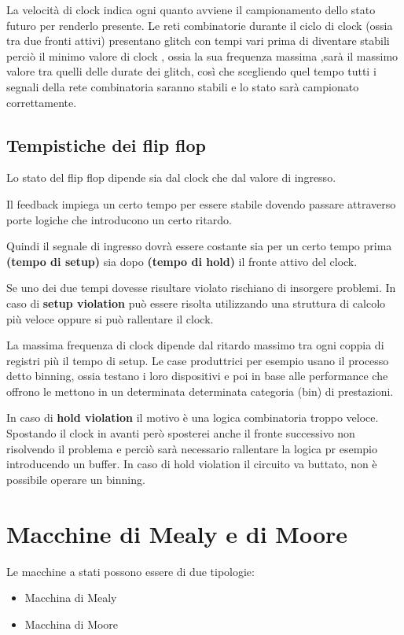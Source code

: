\documentclass[a4paper]{book}
\begin{document}
La velocità di clock indica ogni quanto avviene il campionamento dello stato futuro per renderlo presente.
Le reti combinatorie durante il ciclo di clock (ossia tra due fronti attivi) presentano glitch con tempi vari prima di diventare stabili perciò il minimo valore di clock , ossia la sua frequenza massima ,sarà il massimo valore tra quelli delle durate dei glitch, così che scegliendo quel tempo tutti i segnali della rete combinatoria saranno stabili e lo stato sarà campionato correttamente.

\subsection*{Tempistiche dei flip flop}

Lo stato del flip flop dipende sia dal clock che dal valore di ingresso.

Il feedback impiega un certo tempo per essere stabile dovendo passare attraverso porte logiche che introducono un certo ritardo.

Quindi il segnale di ingresso dovrà essere costante sia per un certo tempo prima \textbf{(tempo di setup)} sia dopo \textbf{(tempo di hold)} il fronte attivo del clock.

Se uno dei due tempi dovesse risultare violato rischiano di insorgere problemi.
In caso di \textbf{setup violation} può essere risolta utilizzando una struttura di calcolo più veloce oppure si può rallentare il clock.

La massima frequenza di clock dipende dal ritardo massimo tra ogni coppia di registri più il tempo di setup.\vspace{\baselineskip}
Le case produttrici per esempio usano il processo detto binning, ossia testano i loro dispositivi e poi in base alle performance che offrono le mettono in un determinata determinata categoria (bin) di prestazioni.

In caso di \textbf{hold violation} il motivo è una logica combinatoria troppo veloce.
Spostando il clock in avanti però sposterei anche il fronte successivo non risolvendo il problema e perciò sarà necessario rallentare la logica pr esempio introducendo un buffer.
In caso di hold violation il circuito va buttato, non è possibile operare un binning.


\section{Macchine di Mealy e di Moore}

Le macchine a stati possono essere di due tipologie:
\begin{itemize}
\item Macchina di Mealy
\item Macchina di Moore
\end{itemize}
\end{document}
